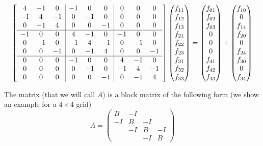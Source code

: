 \documentclass{article}
\begin{document}
\begin{equation}
\left[
\begin{array}{c c c | c c c | c c c}
 4&-1& 0&-1& 0& 0& 0& 0& 0 \\
-1& 4&-1& 0&-1& 0& 0& 0& 0 \\
 0&-1& 4& 0& 0&-1& 0& 0& 0 \\ \hline
-1& 0& 0& 4&-1& 0&-1& 0& 0 \\
 0&-1& 0&-1& 4&-1& 0&-1& 0 \\
 0& 0&-1& 0&-1& 4& 0& 0&-1\\ \hline
 0& 0& 0&-1& 0& 0& 4&-1& 0 \\
 0& 0& 0& 0&-1& 0&-1& 4&-1\\
 0& 0& 0& 0& 0&-1& 0&-1& 4
\end{array}
\right]
\left(
\begin{matrix}
f_{11}\\
f_{12}\\
f_{13}\\
f_{21}\\
f_{22}\\
f_{23}\\
f_{31}\\
f_{32}\\
f_{33}
\end{matrix}
\right)
=
\left(
\begin{matrix}
f_{01}\\
f_{02}\\
f_{03}\\
0\\
0\\
0\\
f_{41}\\
f_{42}\\
f_{43}
\end{matrix}
\right)
+
\left(
\begin{matrix}
f_{10}\\
0\\
f_{14}\\
f_{20}\\
0\\
f_{24}\\
f_{30}\\
0\\
f_{34}
\end{matrix}
\right)
\label{matrixeq}
\end{equation}

The matrix (that we will call $A$) is a block matrix of the following form
(we show an example for a $4\times 4$ grid)
\[
A =
\left(
\begin{matrix}
B & -I & & \\
-I & B & -I & \\
 & -I & B & -I \\
 & & -I & B
\end{matrix}
\right)
\]
\end{document}

